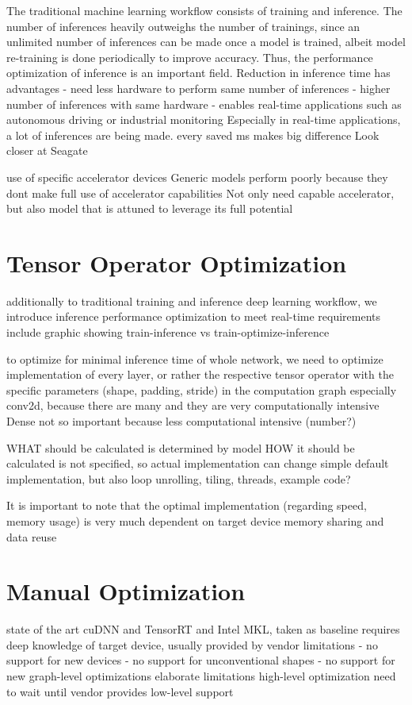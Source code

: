 The traditional machine learning workflow consists of training and inference.
The number of inferences heavily outweighs the number of trainings, since an unlimited number of inferences can be made once a model is trained, albeit model re-training is done periodically to improve accuracy.
Thus, the performance optimization of inference is an important field.
Reduction in inference time has advantages
- need less hardware to perform same number of inferences
- higher number of inferences with same hardware
- enables real-time applications such as autonomous driving or industrial monitoring
Especially in real-time applications, a lot of inferences are being made. every saved ms makes big difference
Look closer at Seagate

use of specific accelerator devices
Generic models perform poorly because they dont make full use of accelerator capabilities
Not only need capable accelerator, but also model that is attuned to leverage its full potential

\section{Tensor Operator Optimization}
additionally to traditional training and inference deep learning workflow, we introduce inference performance optimization to meet real-time requirements
include graphic showing train-inference vs train-optimize-inference

to optimize for minimal inference time of whole network, we need to optimize implementation of every layer, or rather the respective tensor operator with the specific parameters (shape, padding, stride) in the computation graph
especially conv2d, because there are many and they are very computationally intensive
Dense not so important because less computational intensive (number?)

WHAT should be calculated is determined by model
HOW it should be calculated is not specified, so actual implementation can change
simple default implementation, but also loop unrolling, tiling, threads, example code?

It is important to note that the optimal implementation (regarding speed, memory usage) is very much dependent on target device
memory sharing and data reuse

\section{Manual Optimization}
state of the art cuDNN and TensorRT and Intel MKL, taken as baseline
requires deep knowledge of target device, usually provided by vendor
limitations
- no support for new devices
- no support for unconventional shapes
- no support for new graph-level optimizations
elaborate limitations
high-level optimization need to wait until vendor provides low-level support


